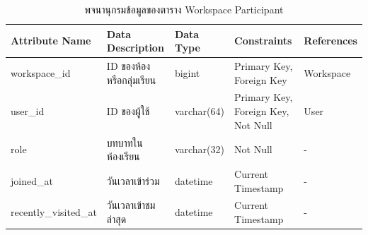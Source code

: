 \documentclass[12pt,one side,openright,a4paper]{cpe-thesis-th}
\begin{document}
\begin{table}[H]
  \centering
  \caption{พจนานุกรมข้อมูลของตาราง Workspace Participant}
  \label{tbl:data-dict-workspace_participants}
  \begin{tabular}{p{2.5cm}|p{3.5cm}p{2cm}p{3cm}p{2cm}} \hline\hline
    Attribute Name        & Data Description    & Data Type   & Constraints                        & References \\ \hline\hline
    workspace\_id         & ID ของห้องหรือกลุ่มเรียน & bigint      & Primary Key, Foreign Key           & Workspace  \\
    user\_id              & ID ของผู้ใช้           & varchar(64) & Primary Key, Foreign Key, Not Null & User       \\
    role                  & บทบาทในห้องเรียน      & varchar(32) & Not Null                           & -          \\
    joined\_at            & วันเวลาเข้าร่วม        & datetime    & Current Timestamp                  & -          \\
    recently\_visited\_at & วันเวลาเข้าชมล่าสุด     & datetime    & Current Timestamp                  & -          \\ \hline\hline
  \end{tabular}
\end{table}
\end{document}
